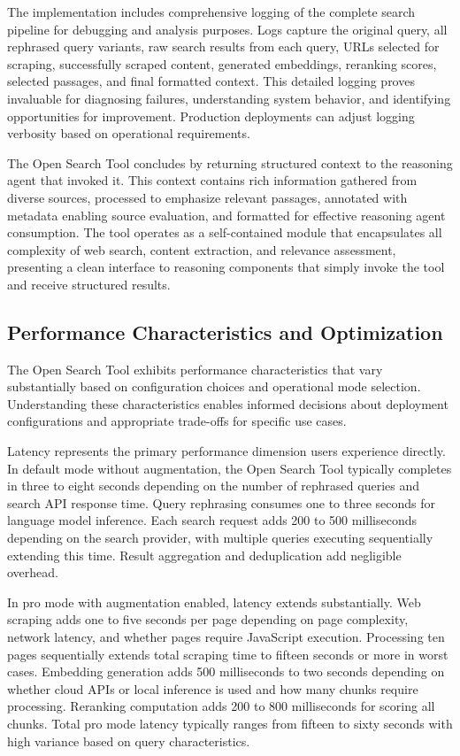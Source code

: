 The implementation includes comprehensive logging of the complete search pipeline for debugging and analysis purposes. Logs capture the original query, all rephrased query variants, raw search results from each query, URLs selected for scraping, successfully scraped content, generated embeddings, reranking scores, selected passages, and final formatted context. This detailed logging proves invaluable for diagnosing failures, understanding system behavior, and identifying opportunities for improvement. Production deployments can adjust logging verbosity based on operational requirements.

The Open Search Tool concludes by returning structured context to the reasoning agent that invoked it. This context contains rich information gathered from diverse sources, processed to emphasize relevant passages, annotated with metadata enabling source evaluation, and formatted for effective reasoning agent consumption. The tool operates as a self-contained module that encapsulates all complexity of web search, content extraction, and relevance assessment, presenting a clean interface to reasoning components that simply invoke the tool and receive structured results.

\subsection{Performance Characteristics and Optimization}

The Open Search Tool exhibits performance characteristics that vary substantially based on configuration choices and operational mode selection. Understanding these characteristics enables informed decisions about deployment configurations and appropriate trade-offs for specific use cases.

Latency represents the primary performance dimension users experience directly. In default mode without augmentation, the Open Search Tool typically completes in three to eight seconds depending on the number of rephrased queries and search API response time. Query rephrasing consumes one to three seconds for language model inference. Each search request adds 200 to 500 milliseconds depending on the search provider, with multiple queries executing sequentially extending this time. Result aggregation and deduplication add negligible overhead.

In pro mode with augmentation enabled, latency extends substantially. Web scraping adds one to five seconds per page depending on page complexity, network latency, and whether pages require JavaScript execution. Processing ten pages sequentially extends total scraping time to fifteen seconds or more in worst cases. Embedding generation adds 500 milliseconds to two seconds depending on whether cloud APIs or local inference is used and how many chunks require processing. Reranking computation adds 200 to 800 milliseconds for scoring all chunks. Total pro mode latency typically ranges from fifteen to sixty seconds with high variance based on query characteristics.

